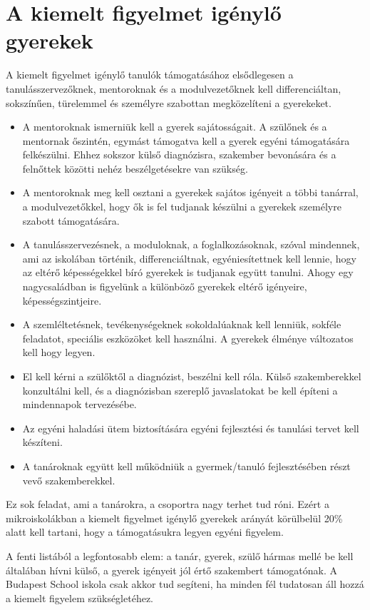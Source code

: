 \section{A kiemelt figyelmet igénylő gyerekek}
\label{sec:kiemelt_figyelem}

A kiemelt figyelmet igénylő tanulók támogatásához  elsődlegesen a tanulásszervezőknek, mentoroknak és a modulvezetőknek kell differenciáltan, sokszínűen, türelemmel és személyre szabottan megközelíteni a gyerekeket.

\begin{itemize}
      \item A mentoroknak ismerniük kell a gyerek sajátosságait. A szülőnek és a mentornak őszintén, egymást támogatva kell a gyerek egyéni támogatására felkészülni. Ehhez sokszor külső diagnózisra, szakember bevonására és a felnőttek közötti nehéz beszélgetésekre van szükség.
      \item A mentoroknak meg kell osztani a gyerekek sajátos igényeit a többi tanárral, a modulvezetőkkel, hogy ők is fel tudjanak készülni a gyerekek személyre szabott támogatására.
      \item A tanulásszervezésnek, a moduloknak, a foglalkozásoknak, szóval min\-dennek, ami az iskolában történik,  differenciáltnak, egyéniesítettnek kell lennie, hogy az eltérő képességekkel bíró gyerekek is tudjanak együtt tanulni. Ahogy egy nagycsaládban  is figyelünk a különböző gyerekek eltérő igényeire, képességszintjeire.
      \item A szemléltetésnek, tevékenységeknek sokoldalúaknak kell lenniük, sokféle feladatot, speciális eszközöket kell használni. A gyerekek élménye változatos kell hogy legyen.
      \item El kell kérni a szülőktől a diagnózist, beszélni kell róla. Külső szakemberekkel konzultálni kell, és a diagnózisban szereplő javaslatokat be kell építeni a mindennapok tervezésébe.
      \item Az egyéni haladási ütem biztosítására egyéni fejlesztési és tanulási tervet kell készíteni.
      \item A tanároknak együtt kell működniük a gyermek/tanuló fejlesztésében részt vevő szakemberekkel.
\end{itemize}

Ez sok feladat, ami a tanárokra, a csoportra nagy terhet tud róni. Ezért a mikroiskolákban a kiemelt figyelmet igénylő gyerekek arányát körülbelül 20\% alatt kell tartani, hogy a támogatásukra legyen egyéni figyelem.

A fenti listából a legfontosabb elem: a tanár, gyerek, szülő hármas
mellé be kell általában hívni külső, a gyerek igényeit jól értő
szakembert támogatónak. A Budapest School iskola csak akkor tud
segíteni, ha minden fél tudatosan áll hozzá a kiemelt figyelem
szükségletéhez.\newpage
\thispagestyle{empty}

